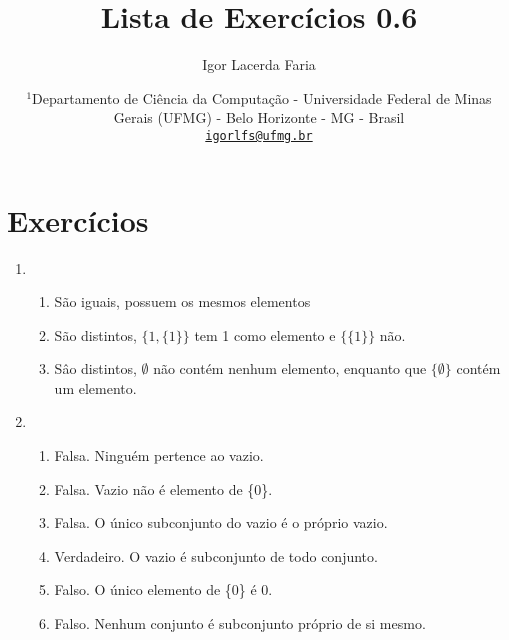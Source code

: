 \documentclass{article}
\author{Igor Lacerda Faria}
\begin{document}
\title{\textbf{Lista de Exercícios 0.6}}
\date{%
    \( ^1 \)Departamento de Ciência da Computação - Universidade Federal de Minas Gerais (UFMG) - Belo Horizonte - MG - Brasil \\ [3ex]
    \href{mailto:igorlfs@ufmg.br}{\nolinkurl{igorlfs@ufmg.br}}
}
\maketitle
\section*{Exercícios}
\begin{enumerate}

    \item

        \begin{enumerate}

            \item São iguais, possuem os mesmos elementos

            \item São distintos, \( \{1,\{1\}\} \) tem 1 como elemento e \( \{\{1\}\} \) não.

            \item Sâo distintos, \( \emptyset \) não contém nenhum elemento, enquanto que \( \{ \emptyset\} \) contém um elemento.

        \end{enumerate}

    \item 

        \begin{enumerate}

            \item Falsa. Ninguém pertence ao vazio.

            \item Falsa. Vazio não é elemento de \{0\}.

            \item Falsa. O único subconjunto do vazio é o próprio vazio.

            \item Verdadeiro. O vazio é subconjunto de todo conjunto.

            \item Falso. O único elemento de \{0\} é 0.

            \item Falso. Nenhum conjunto é subconjunto próprio de si mesmo.


\end{enumerate}
\end{enumerate}
\end{document}
